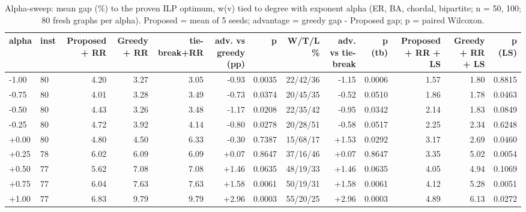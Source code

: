 \begin{table}[t]
\centering
\caption{Alpha-sweep: mean gap (\%) to the proven ILP optimum, w(v) tied to degree with exponent alpha (ER, BA, chordal, bipartite; n = 50, 100; 80 fresh graphs per alpha). Proposed = mean of 5 seeds; advantage = greedy gap - Proposed gap; p = paired Wilcoxon.}
\label{tab:alpha_sweep}
\scriptsize
\begin{tabular}{llrrrrrrrrrrr}
\toprule
alpha & inst & Proposed + RR & Greedy + RR & tie-break+RR & adv. vs greedy (pp) & p & W/T/L \% & adv. vs tie-break & p (tb) & Proposed + RR + LS & Greedy + RR + LS & p (LS) \\
\midrule
-1.00 & 80 & 4.20 & 3.27 & 3.05 & -0.93 & 0.0035 & 22/42/36 & -1.15 & 0.0006 & 1.57 & 1.80 & 0.8815 \\
-0.75 & 80 & 4.01 & 3.28 & 3.49 & -0.73 & 0.0374 & 20/45/35 & -0.52 & 0.0510 & 1.86 & 1.78 & 0.0463 \\
-0.50 & 80 & 4.43 & 3.26 & 3.48 & -1.17 & 0.0208 & 22/35/42 & -0.95 & 0.0342 & 2.14 & 1.83 & 0.0849 \\
-0.25 & 80 & 4.72 & 3.92 & 4.14 & -0.80 & 0.0278 & 20/28/51 & -0.58 & 0.0517 & 2.25 & 2.34 & 0.6248 \\
+0.00 & 80 & 4.80 & 4.50 & 6.33 & -0.30 & 0.7387 & 15/68/17 & +1.53 & 0.0292 & 3.17 & 2.69 & 0.0460 \\
+0.25 & 78 & 6.02 & 6.09 & 6.09 & +0.07 & 0.8647 & 37/16/46 & +0.07 & 0.8647 & 3.35 & 5.02 & 0.0054 \\
+0.50 & 77 & 5.62 & 7.08 & 7.08 & +1.46 & 0.0635 & 48/19/33 & +1.46 & 0.0635 & 4.05 & 4.94 & 0.1069 \\
+0.75 & 77 & 6.04 & 7.63 & 7.63 & +1.58 & 0.0061 & 50/19/31 & +1.58 & 0.0061 & 4.12 & 5.28 & 0.0051 \\
+1.00 & 77 & 6.83 & 9.79 & 9.79 & +2.96 & 0.0003 & 55/20/25 & +2.96 & 0.0003 & 4.89 & 6.13 & 0.0272 \\
\bottomrule
\end{tabular}
\end{table}
